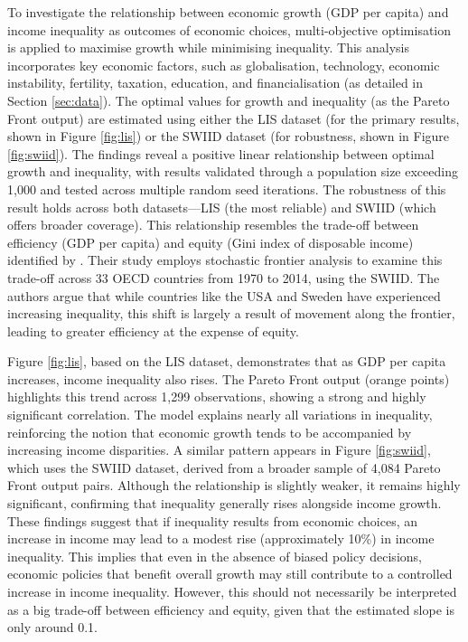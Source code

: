 \documentclass[12pt]{article}
\begin{document}
To investigate the relationship between economic growth (GDP per capita) and income inequality as outcomes of economic choices, multi-objective optimisation is applied to maximise growth while minimising inequality. This analysis incorporates key economic factors, such as globalisation, technology, economic instability, fertility, taxation, education, and financialisation (as detailed in Section \ref{sec:data}). The optimal values for growth and inequality (as the Pareto Front output) are estimated using either the LIS dataset (for the primary results, shown in Figure \ref{fig:lis}) or the SWIID dataset (for robustness, shown in Figure \ref{fig:swiid}). The findings reveal a positive linear relationship between optimal growth and inequality, with results validated through a population size exceeding 1,000 and tested across multiple random seed iterations. The robustness of this result holds across both datasets—LIS (the most reliable) and SWIID (which offers broader coverage). This relationship resembles the trade-off between efficiency (GDP per capita) and equity (Gini index of disposable income) identified by \textcite{andersen2020big}. Their study employs stochastic frontier analysis to examine this trade-off across 33 OECD countries from 1970 to 2014, using the SWIID. The authors argue that while countries like the USA and Sweden have experienced increasing inequality, this shift is largely a result of movement along the frontier, leading to greater efficiency at the expense of equity.

Figure \ref{fig:lis}, based on the LIS dataset, demonstrates that as GDP per capita increases, income inequality also rises. The Pareto Front output (orange points) highlights this trend across 1,299 observations, showing a strong and highly significant correlation. The model explains nearly all variations in inequality, reinforcing the notion that economic growth tends to be accompanied by increasing income disparities. A similar pattern appears in Figure \ref{fig:swiid}, which uses the SWIID dataset, derived from a broader sample of 4,084 Pareto Front output pairs. Although the relationship is slightly weaker, it remains highly significant, confirming that inequality generally rises alongside income growth. These findings suggest that if inequality results from economic choices, an increase in income may lead to a modest rise (approximately 10\%) in income inequality.  This implies that even in the absence of biased policy decisions, economic policies that benefit overall growth may still contribute to a controlled increase in income inequality. However, this should not necessarily be interpreted as a big trade-off between efficiency and equity, given that the estimated slope is only around 0.1.
\end{document}
